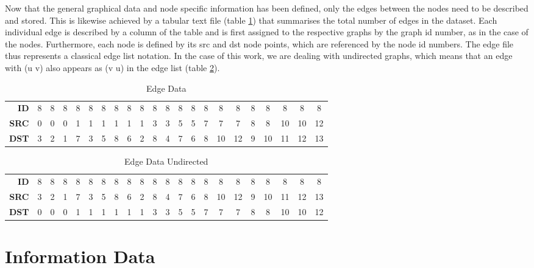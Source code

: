 \documentclass[a4paper, 12pt]{report}
\begin{document}
Now that the general graphical data and node specific information has been defined, only the edges between the nodes need to be described and stored. This is likewise achieved by a tabular text file (table \ref{tab:edge-data}) that summarises the total number of edges in the dataset. Each individual edge is described by a column of the table and is first assigned to the respective graphs by the graph \acrlong{id} number, as in the case of the nodes. Furthermore, each node is defined by its \acrfull{src} and \acrfull{dst} node points, which are referenced by the node \acrlong{id} numbers. The edge file thus represents a classical edge list notation. In the case of this work, we are dealing with undirected graphs, which means that an edge with (u v) also appears as (v u) in the edge list (table \ref{tab:edge-data-undirected}).

\begin{table}
\centering
\begin{tabular}{ rccccccccccccccccccccc }
\textbf{ID} & 8 & 8 & 8 & 8 & 8 & 8 & 8 & 8 & 8 & 8 & 8 & 8 & 8 & 8 & 8 & 8 & 8 & 8 & 8 & 8 & 8 \\
\textbf{SRC} & 0 & 0 & 0 & 1 & 1 & 1 & 1 & 1 & 1 & 3 & 3 & 5 & 5 & 7 & 7 & 7 & 8 & 8 & 10 & 10 & 12 \\
\textbf{DST} & 3 & 2 & 1 & 7 & 3 & 5 & 8 & 6 & 2 & 8 & 4 & 7 & 6 & 8 & 10 & 12 & 9 & 10 & 11 & 12 & 13 \\
\end{tabular}
\caption{Edge Data}
\label{tab:edge-data}
\end{table}

\begin{table}
\centering
\begin{tabular}{ rccccccccccccccccccccc }
\textbf{ID} & 8 & 8 & 8 & 8 & 8 & 8 & 8 & 8 & 8 & 8 & 8 & 8 & 8 & 8 & 8 & 8 & 8 & 8 & 8 & 8 & 8 \\
\textbf{SRC} & 3 & 2 & 1 & 7 & 3 & 5 & 8 & 6 & 2 & 8 & 4 & 7 & 6 & 8 & 10 & 12 & 9 & 10 & 11 & 12 & 13 \\
\textbf{DST} & 0 & 0 & 0 & 1 & 1 & 1 & 1 & 1 & 1 & 3 & 3 & 5 & 5 & 7 & 7 & 7 & 8 & 8 & 10 & 10 & 12 \\
\end{tabular}
\caption{Edge Data Undirected}
\label{tab:edge-data-undirected}
\end{table}

\section{Information Data}\label{sec:information-data}
\end{document}
